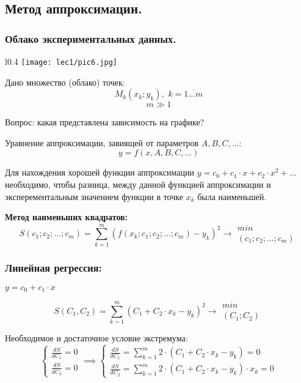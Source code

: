 \documentclass[12pt]{article}
\begin{document}
\subsection{Метод аппроксимации.}
\subsubsection{Облако экспериментальных данных.}
\begin{wrapfigure}{l}{0.4\textwidth}
	\texttt{[image: lec1/pic6.jpg]}
\end{wrapfigure}

Дано множество (облако) точек:
\[ M_k(x_k;y_k), \hspace{4pt} k=\overline{1 \ldots m} \]
\[ m \gg 1 \]

Вопрос: какая представлена зависимость на графике?

Уравнение аппроксимации, завиящей от параметров \( A, B, C, \ldots \):
\[ y = f(x, A, B, C, \ldots) \]

\vspace{10pt}
Для нахождения хорошей функции аппроксимации \( y = c_0 + c_1 \cdot x + c_2
\cdot x^2 + \ldots  \)
необходимо, чтобы разница, между данной функцией аппроксимации и
эксперементальным значением функции в точке \( x_k \) была наименьшей.

\textbf{Метод наименьших квадратов:}
\[
	S(c_1; c_2; \ldots; c_m) =
	\sum_{k=1}^{m}(f(x_k; c_1; c_2; \ldots ; c_m) - y_k)^2 \to
	\substack{min\\(c_1; c_2; \ldots ; c_m)}
\]


\subsubsection{Линейная регрессия:}
\hspace{40pt} \( y = c_0 + c_1 \cdot x \)

\[
	S(C_1, C_2) = \sum_{k=1}^m \left( C_1 + C_2 \cdot x_k - y_k \right)^2
	\to \substack{min\\(C_1; C_2)}
\]

Необходимое и достаточное условие экстремума:
\begin{equation*}
	\begin{cases}
		\frac{dS}{dC_1} = 0 \\
		\frac{dS}{dC_2} = 0
	\end{cases}
	\implies
	\begin{cases}
		\frac{dS}{dC_1} =
		\sum_{k=1}^m 2 \cdot \left( C_1 + C_2 \cdot x_k - y_k \right) = 0 \\
		\frac{dS}{dC_2} =
		\sum_{k=1}^m 2 \cdot \left( C_1 + C_2 \cdot x_k - y_k \right) \cdot x_k = 0
	\end{cases}
\end{equation*}
\end{document}
